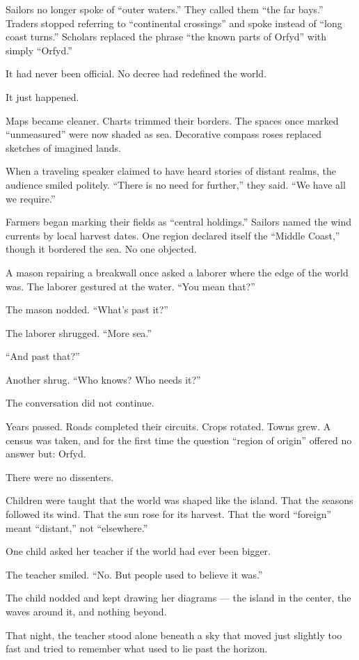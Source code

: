 \documentclass[9pt]{article}
\begin{document}
Sailors no longer spoke of ``outer waters.'' They called them ``the far bays.'' Traders stopped referring to ``continental crossings'' and spoke instead of ``long coast turns.'' Scholars replaced the phrase ``the known parts of Orfyd'' with simply ``Orfyd.''

It had never been official. No decree had redefined the world.

It just happened.

Maps became cleaner. Charts trimmed their borders. The spaces once marked ``unmeasured'' were now shaded as sea. Decorative compass roses replaced sketches of imagined lands.

When a traveling speaker claimed to have heard stories of distant realms, the audience smiled politely. ``There is no need for further,'' they said. ``We have all we require.''

Farmers began marking their fields as ``central holdings.'' Sailors named the wind currents by local harvest dates. One region declared itself the ``Middle Coast,'' though it bordered the sea. No one objected.

A mason repairing a breakwall once asked a laborer where the edge of the world was. The laborer gestured at the water. ``You mean that?''

The mason nodded. ``What’s past it?''

The laborer shrugged. ``More sea.''

``And past that?''

Another shrug. ``Who knows? Who needs it?''

The conversation did not continue.

Years passed. Roads completed their circuits. Crops rotated. Towns grew. A census was taken, and for the first time the question ``region of origin'' offered no answer but: Orfyd.

There were no dissenters.

Children were taught that the world was shaped like the island. That the seasons followed its wind. That the sun rose for its harvest. That the word ``foreign'' meant ``distant,'' not ``elsewhere.''

One child asked her teacher if the world had ever been bigger.

The teacher smiled. ``No. But people used to believe it was.''

The child nodded and kept drawing her diagrams — the island in the center, the waves around it, and nothing beyond.

That night, the teacher stood alone beneath a sky that moved just slightly too fast and tried to remember what used to lie past the horizon.
\end{document}
